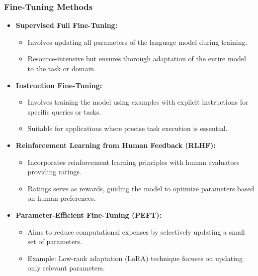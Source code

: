 \begin{frame}[fragile]\frametitle{Fine-Tuning Methods}

\begin{itemize}
\item \textbf{Supervised Full Fine-Tuning:}
  \begin{itemize}
	\item Involves updating all parameters of the language model during training.
	\item Resource-intensive but ensures thorough adaptation of the entire model to the task or domain.
  \end{itemize}
\item \textbf{Instruction Fine-Tuning:}
  \begin{itemize}
	\item Involves training the model using examples with explicit instructions for specific queries or tasks.
	\item Suitable for applications where precise task execution is essential.
  \end{itemize}
\item \textbf{Reinforcement Learning from Human Feedback (RLHF):}
  \begin{itemize}
	\item Incorporates reinforcement learning principles with human evaluators providing ratings.
	\item Ratings serve as rewards, guiding the model to optimize parameters based on human preferences.
  \end{itemize}
\item \textbf{Parameter-Efficient Fine-Tuning (PEFT):}
  \begin{itemize}
	\item Aims to reduce computational expenses by selectively updating a small set of parameters.
	\item Example: Low-rank adaptation (LoRA) technique focuses on updating only relevant parameters.
  \end{itemize}  
\end{itemize}

\end{frame}

